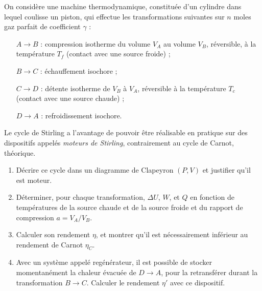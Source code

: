 On considère une machine thermodynamique, constituée d'un cylindre dans lequel coulisse un piston, qui effectue les transformations suivantes sur $n$ moles gaz parfait de coefficient $\gamma$ : 

\begin{itemize}
\item[$A \rightarrow B$ :] compression isotherme du volume $V_A$ au volume $V_B$, réversible, à la température $T_f$ (contact avec une source froide) ;
\item[$B \rightarrow C$ :] échauffement isochore ;
\item[$C \rightarrow D$ :] détente isotherme de $V_B$ à $V_A$, réversible à la température $T_c$ (contact avec une source chaude) ;
\item[$D \rightarrow A$] : refroidissement isochore.

\end{itemize}

Le cycle de Stirling a l'avantage de pouvoir être réalisable en pratique sur des dispositifs appelés \textit{moteurs de Stirling}, contrairement au cycle de Carnot, théorique.

\begin{enumerate}

	\item Décrire ce cycle dans un diagramme de Clapeyron $(P,V)$ et justifier qu'il est moteur.

	\item Déterminer, pour chaque transformation, $\Delta U$, $W$, et $Q$ en fonction de températures de la source chaude et de la source froide et du rapport de compression $a=V_A/V_B$.
	
	\item  Calculer son rendement $\eta$, et montrer qu'il est nécessairement inférieur au rendement de Carnot $\eta_C$.
	
	\item Avec un système appelé regénérateur, il est possible de stocker momentanément la chaleur évacuée de $D \rightarrow A$, pour la retransférer durant la transformation $B \rightarrow C$. Calculer le rendement $\eta'$ avec ce dispositif.
		
\end{enumerate}

\newpage

